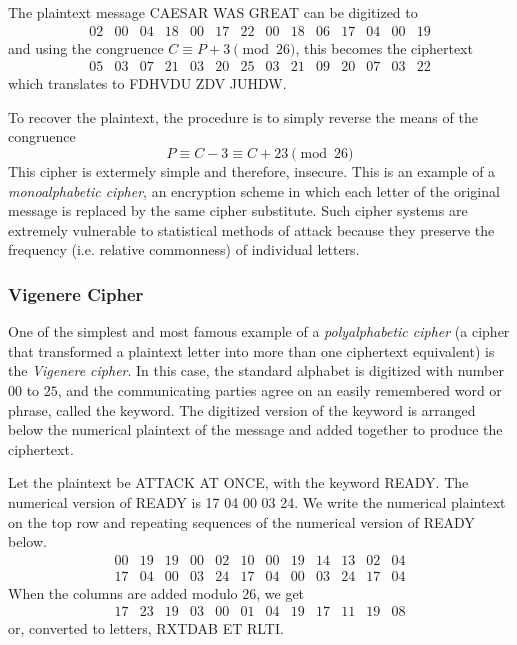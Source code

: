 \documentclass{article}
\theoremstyle{remark}
\theoremstyle{definition}
\begin{document}
The plaintext message CAESAR WAS GREAT can be digitized to 
\[\begin{array}{cccccccccccccc}
     02&00&04&18&00&17&22&00&18&06&17&04&00&19 
\end{array}\]
and using the congruence $C \equiv P + 3 \pmod{26}$, this becomes the ciphertext
\[\begin{array}{cccccccccccccc}
     05&03&07&21&03&20&25&03&21&09&20&07&03&22
\end{array}\]
which translates to FDHVDU ZDV JUHDW. 

To recover the plaintext, the procedure is to simply reverse the means of the congruence
\[P \equiv C - 3 \equiv C + 23 \pmod{26}\]
This cipher is extermely simple and therefore, insecure. This is an example of a \textit{monoalphabetic cipher}, an encryption scheme in which each letter of the original message is replaced by the same cipher substitute. Such cipher systems are extremely vulnerable to statistical methods of attack because they preserve the frequency (i.e. relative commonness) of individual letters. 


\subsubsection{Vigenere Cipher}
One of the simplest and most famous example of a \textit{polyalphabetic cipher} (a cipher that transformed a plaintext letter into more than one ciphertext equivalent) is the \textit{Vigenere cipher}. In this case, the standard alphabet is digitized with number $00$ to $25$, and the communicating parties agree on an easily remembered word or phrase, called the keyword. The digitized version of the keyword is arranged below the numerical plaintext of the message and added together to produce the ciphertext. 

Let the plaintext be ATTACK AT ONCE, with the keyword READY. The numerical version of READY is 17 04 00 03 24. We write the numerical plaintext on the top row and repeating sequences of the numerical version of READY below. 
\[\begin{array}{cccccccccccc}
    00&19&19&00&02&10&00&19&14&13&02&04 \\
    17&04&00&03&24&17&04&00&03&24&17&04 
\end{array}\]
When the columns are added modulo $26$, we get
\[\begin{array}{cccccccccccc}
    17&23&19&03&00&01&04&19&17&11&19&08
\end{array}\]
or, converted to letters, RXTDAB ET RLTI. 
\end{document}

